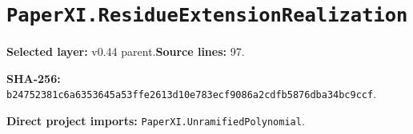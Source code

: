 \documentclass[10pt,oneside]{book}
\begin{document}
\section{\texorpdfstring{\nolinkurl{PaperXI.ResidueExtensionRealization}}{PaperXI.ResidueExtensionRealization}}\label{module:PaperXI.ResidueExtensionRealization}

\textbf{Selected layer:} v0.44 parent.\quad\textbf{Source lines:} 97.\par\textbf{SHA-256:} {\scriptsize\nolinkurl{b24752381c6a6353645a53ffe2613d10e783ecf9086a2cdfb5876dba34bc9ccf}}.


\textbf{Direct project imports:} \nolinkurl{PaperXI.UnramifiedPolynomial}.
\end{document}
